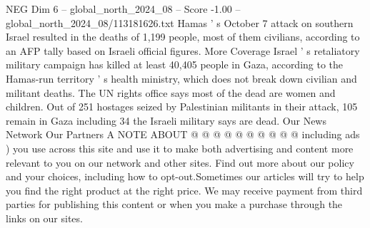 \begin{textsample}{NEG Dim 6 – global\_north\_2024\_08 – Score -1.00 – global\_north\_2024\_08/113181626.txt}
Hamas ' s October 7 attack on southern Israel resulted in the deaths of 1,199 people, most of them civilians, according to an AFP tally based on Israeli official figures.
More Coverage Israel ' s retaliatory military campaign has killed at least 40,405 people in Gaza, according to the Hamas-run territory ' s health ministry, which does not break down civilian and militant deaths.
The UN rights office says most of the dead are women and children.
Out of 251 hostages seized by Palestinian militants in their attack, 105 remain in Gaza including 34 the Israeli military says are dead.
Our News Network Our Partners A NOTE ABOUT @ @ @ @ @ @ @ @ @ @ including ads ) you use across this site and use it to make both advertising and content more relevant to you on our network and other sites.
Find out more about our policy and your choices, including how to opt-out.Sometimes our articles will try to help you find the right product at the right price.
We may receive payment from third parties for publishing this content or when you make a purchase through the links on our sites.

\end{textsample}
